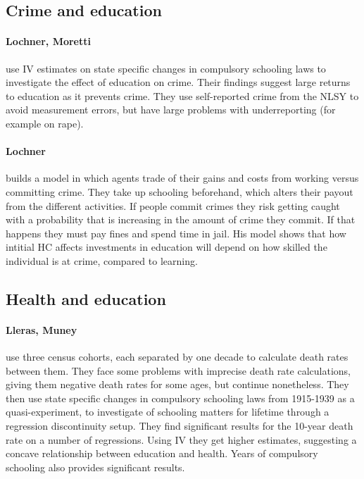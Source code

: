 \documentclass[12pt, a4paper]{article}
\begin{document}
\begin{multicols}{2}
\subsection{Crime and education}

\paragraph{Lochner, Moretti} use IV estimates on state specific changes in compulsory schooling laws to investigate the effect of education on crime. Their findings suggest large returns to education as it prevents crime. They use self-reported crime from the NLSY to avoid measurement errors, but have large problems with underreporting (for example on rape).

\paragraph{Lochner} builds a model in which agents trade of their gains and costs from working versus committing crime. They take up schooling beforehand, which alters their payout from the different activities. If people commit crimes they risk getting caught with a probability that is increasing in the amount of crime they commit. If that happens they must pay fines and spend time in jail. His model shows that how intitial HC affects investments in education will depend on how skilled the individual is at crime, compared to learning.

\subsection{Health and education}
\paragraph{Lleras, Muney} use three census cohorts, each separated by one decade to calculate death rates between them. They face some problems with imprecise death rate calculations, giving them negative death rates for some ages, but continue nonetheless. They then use state specific changes in compulsory schooling laws from 1915-1939 as a quasi-experiment, to investigate of schooling matters for lifetime through a regression discontinuity setup. They find significant results for the 10-year death rate on a number of regressions. Using IV they get higher estimates, suggesting a concave relationship between education and health. Years of compulsory schooling also provides significant results.


\end{multicols}
\end{document}
